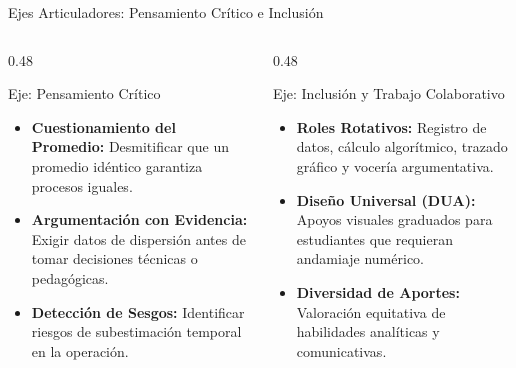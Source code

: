 \documentclass[
	spanish,
	aspectratio=169,
	xcolor={dvipsnames,table}
]{beamer}
\begin{document}
\begin{frame}{Ejes Articuladores: Pensamiento Crítico e Inclusión}
\small
\begin{columns}[T]
	\begin{column}{0.48\textwidth}
		\begin{block}{Eje: Pensamiento Crítico}
			\begin{itemize}\setlength{\itemsep}{0.12cm}
				\item \textbf{Cuestionamiento del Promedio:} Desmitificar que un promedio idéntico garantiza procesos iguales.
				\item \textbf{Argumentación con Evidencia:} Exigir datos de dispersión antes de tomar decisiones técnicas o pedagógicas.
				\item \textbf{Detección de Sesgos:} Identificar riesgos de subestimación temporal en la operación.
			\end{itemize}
		\end{block}
	\end{column}
	\begin{column}{0.48\textwidth}
		\begin{block}{Eje: Inclusión y Trabajo Colaborativo}
			\begin{itemize}\setlength{\itemsep}{0.12cm}
				\item \textbf{Roles Rotativos:} Registro de datos, cálculo algorítmico, trazado gráfico y vocería argumentativa.
				\item \textbf{Diseño Universal (DUA):} Apoyos visuales graduados para estudiantes que requieran andamiaje numérico.
				\item \textbf{Diversidad de Aportes:} Valoración equitativa de habilidades analíticas y comunicativas.
			\end{itemize}
		\end{block}
	\end{column}
\end{columns}
\end{frame}
\end{document}
